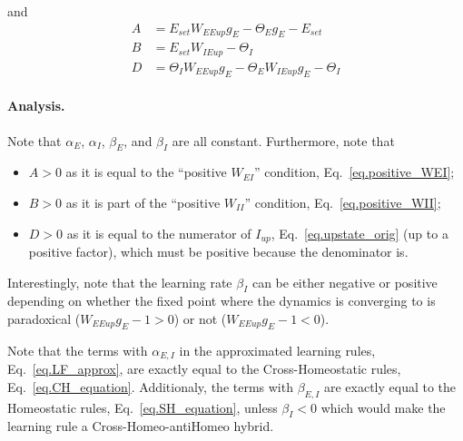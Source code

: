 \documentclass[twocolumn]{article}
\newcommand{\EE}{\mathit{EE}}
\newcommand{\EI}{\mathit{EI}}
\newcommand{\IE}{\mathit{IE}}
\newcommand{\II}{\mathit{II}}
\newcommand{\set}{\mathit{set}}
\newcommand{\up}{\mathit{up}}
\begin{document}
\noindent and
\begin{displaymath}
\begin{aligned}
A & = E_{\set} W_{\EE\up} g_E - \Theta_E g_E - E_{\set} \\
B & = E_{\set} W_{\IE\up} - \Theta_I \\
D & = \Theta_I W_{\EE\up} g_E - \Theta_E W_{\IE\up} g_E - \Theta_I
\end{aligned}
\end{displaymath}

\paragraph{Analysis.} Note that $\alpha_E$, $\alpha_I$, $\beta_E$, and $\beta_I$ are all constant. Furthermore, note that
\begin{itemize}
\item $A>0$ as it is equal to the ``positive $W_{\EI}$'' condition, Eq.\ \ref{eq.positive_WEI};
\item $B>0$ as it is part of the ``positive $W_{\II}$'' condition, Eq.\ \ref{eq.positive_WII};
\item $D>0$ as it is equal to the numerator of $I_{\up}$, Eq.\ \ref{eq.upstate_orig} (up to a positive factor), which must be positive because the denominator is.
\end{itemize}

\noindent Interestingly, note that the learning rate $\beta_I$ can be either negative or positive depending on whether the fixed point where the dynamics is converging to is paradoxical ($W_{\EE\up}g_E - 1 > 0$) or not ($W_{\EE\up}g_E - 1 < 0$).


\noindent Note that the terms with $\alpha_{E,I}$ in the approximated learning rules, Eq.\ \ref{eq.LF_approx}, are exactly equal to the Cross-Homeostatic rules, Eq.\ \ref{eq.CH_equation}. Additionaly, the terms with $\beta_{E,I}$ are exactly equal to the Homeostatic rules, Eq.\ \ref{eq.SH_equation}, unless $\beta_I<0$ which would make the learning rule a Cross-Homeo-antiHomeo hybrid.





\printbibliography
\end{document}
